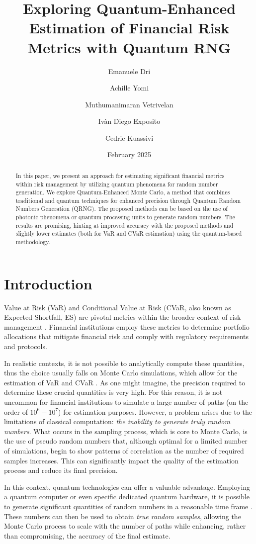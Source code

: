 \documentclass{article}
\title{Exploring Quantum-Enhanced Estimation of Financial Risk Metrics with Quantum RNG}
\author[2]{Emanuele Dri}
\author[1]{Achille Yomi}
\author[1]{Muthumanimaran Vetrivelan}
\author[1]{Ivàn Diego Exposito}
\author[1]{Cedric Kuassivi}
\affil[1]{\textbf{Scenario X}}
\affil[2]{LINKS Foundation}
\date{February 2025}
\begin{document}
\maketitle
\begin{abstract}
    In this paper, we present an approach for estimating significant financial metrics within risk management by utilizing quantum phenomena for random number generation. We explore Quantum-Enhanced Monte Carlo, a method that combines traditional and quantum techniques for enhanced precision through Quantum Random Numbers Generation (QRNG). The proposed methods can be based on the use of photonic phenomena or quantum processing units to generate random numbers. The results are promising, hinting at improved accuracy with the proposed methods and slightly lower estimates (both for VaR and CVaR estimation) using the quantum-based methodology.
\end{abstract}

\section{Introduction}
Value at Risk (VaR) and Conditional Value at Risk (CVaR, also known as Expected Shortfall, ES) are pivotal metrics within the broader context of risk management \cite{gestel2008}. 
Financial institutions employ these metrics to determine portfolio allocations that mitigate financial risk and comply with regulatory requirements and protocols.

In realistic contexts, it is not possible to analytically compute these quantities, thus the choice usually falls on Monte Carlo simulations, which allow for the estimation of VaR and CVaR \cite{hong2014}. 
As one might imagine, the precision required to determine these crucial quantities is very high. 
For this reason, it is not uncommon for financial institutions to simulate a large number of paths (on the order of $10^6-10^7$) for estimation purposes. 
However, a problem arises due to the limitations of classical computation: \textit{the inability to generate truly random numbers}. 
What occurs in the sampling process, which is core to Monte Carlo, is the use of pseudo random numbers that, although optimal for a limited number of simulations, begin to show patterns of correlation as the number of required samples increases. 
This can significantly impact the quality of the estimation process and reduce its final precision.

In this context, quantum technologies can offer a valuable advantage. 
Employing a quantum computer or even specific dedicated quantum hardware, it is possible to generate significant quantities of random numbers in a reasonable time frame \cite{Jennewein2000}. 
These numbers can then be used to obtain \textit{true random samples}, allowing the Monte Carlo process to scale with the number of paths while enhancing, rather than compromising, the accuracy of the final estimate.
\end{document}
